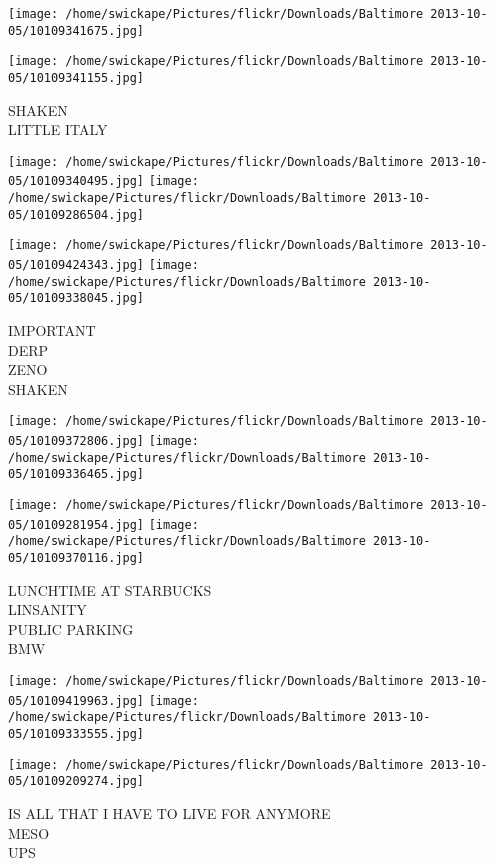 \documentclass[10pt,letterpaper]{article}
\begin{document}
\texttt{[image: /home/swickape/Pictures/flickr/Downloads/Baltimore 2013-10-05/10109341675.jpg]}

\vspace{0.25in}
\texttt{[image: /home/swickape/Pictures/flickr/Downloads/Baltimore 2013-10-05/10109341155.jpg]}

SHAKEN\\
LITTLE ITALY\\
\pagebreak

\texttt{[image: /home/swickape/Pictures/flickr/Downloads/Baltimore 2013-10-05/10109340495.jpg]}
\texttt{[image: /home/swickape/Pictures/flickr/Downloads/Baltimore 2013-10-05/10109286504.jpg]}

\texttt{[image: /home/swickape/Pictures/flickr/Downloads/Baltimore 2013-10-05/10109424343.jpg]}
\texttt{[image: /home/swickape/Pictures/flickr/Downloads/Baltimore 2013-10-05/10109338045.jpg]}

IMPORTANT\\
DERP\\
ZENO\\
SHAKEN\\
\pagebreak

\texttt{[image: /home/swickape/Pictures/flickr/Downloads/Baltimore 2013-10-05/10109372806.jpg]}
\texttt{[image: /home/swickape/Pictures/flickr/Downloads/Baltimore 2013-10-05/10109336465.jpg]}

\texttt{[image: /home/swickape/Pictures/flickr/Downloads/Baltimore 2013-10-05/10109281954.jpg]}
\texttt{[image: /home/swickape/Pictures/flickr/Downloads/Baltimore 2013-10-05/10109370116.jpg]}

LUNCHTIME AT STARBUCKS\\
LINSANITY\\
PUBLIC PARKING\\
BMW\\
\pagebreak

\texttt{[image: /home/swickape/Pictures/flickr/Downloads/Baltimore 2013-10-05/10109419963.jpg]}
\texttt{[image: /home/swickape/Pictures/flickr/Downloads/Baltimore 2013-10-05/10109333555.jpg]}

\texttt{[image: /home/swickape/Pictures/flickr/Downloads/Baltimore 2013-10-05/10109209274.jpg]}

IS ALL THAT I HAVE TO LIVE FOR ANYMORE\\
MESO\\
UPS\\
\pagebreak
\end{document}
